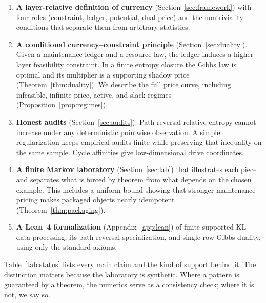 \begin{enumerate}[leftmargin=*]
    \item \textbf{A layer-relative definition of currency} (Section~\ref{sec:framework}) with four roles (constraint, ledger, potential, dual price) and the nontriviality conditions that separate them from arbitrary statistics.
    \item \textbf{A conditional currency--constraint principle} (Section~\ref{sec:duality}). Given a maintenance ledger and a resource law, the ledger induces a higher-layer feasibility constraint. In a finite entropy closure the Gibbs law is optimal and its multiplier is a supporting shadow price (Theorem~\ref{thm:duality}). We describe the full price curve, including infeasible, infinite-price, active, and slack regimes (Proposition~\ref{prop:regimes}).
    \item \textbf{Honest audits} (Section~\ref{sec:audits}). Path-reversal relative entropy cannot increase under any deterministic pointwise observation. A simple regularization keeps empirical audits finite while preserving that inequality on the same sample. Cycle affinities give low-dimensional drive coordinates.
    \item \textbf{A finite Markov laboratory} (Section~\ref{sec:lab}) that illustrates each piece and separates what is forced by theorem from what depends on the chosen example. This includes a uniform bound showing that stronger maintenance pricing makes packaged objects nearly idempotent (Theorem~\ref{thm:packaging}).
    \item \textbf{A Lean~4 formalization} (Appendix~\ref{app:lean}) of finite supported KL data processing, its path-reversal specialization, and single-row Gibbs duality, using only the standard axioms.
\end{enumerate}

Table~\ref{tab:status} lists every main claim and the kind of support behind it. The distinction matters because the laboratory is synthetic. Where a pattern is guaranteed by a theorem, the numerics serve as a consistency check; where it is not, we say so.

